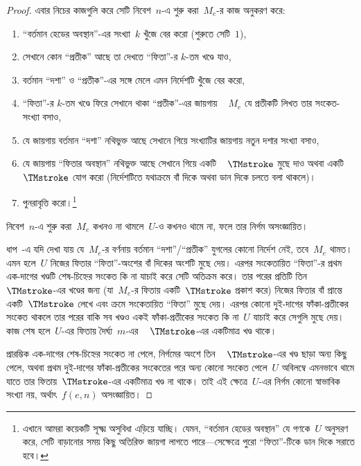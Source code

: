 \documentclass[../../../include/open-logic-section]{subfiles}
\begin{document}
\begin{proof}
  এবার নিচের কাজগুলি করে সেটি নিবেশ~$n$-এ শুরু করা~$M_e$-র কাজ অনুকরণ
  করে:
  \begin{enumerate}
    \item “বর্তমান হেডের অবস্থান”-এর সংখ্যা~$k$ খুঁজে বের করো (শুরুতে
    সেটি~$1$),
    \item সেখানে কোন “প্রতীক” আছে তা দেখতে “ফিতা”-র $k$-তম খণ্ডে যাও,
    \item{}%
    বর্তমান “দশা” ও “প্রতীক”-এর সঙ্গে মেলে এমন নির্দেশটি খুঁজে বের করো,
    \item “ফিতা”-র $k$-তম খণ্ডে ফিরে সেখানে থাকা “প্রতীক”-এর জায়গায়
    ~ $M_e$ যে প্রতীকটি লিখত তার সংকেত-সংখ্যা বসাও,
    \item যে জায়গায় বর্তমান “দশা” নথিভুক্ত আছে সেখানে গিয়ে সংখ্যাটির
    জায়গায় নতুন দশার সংখ্যা বসাও,
    \item যে জায়গায় “ফিতার অবস্থান” নথিভুক্ত আছে সেখানে গিয়ে একটি
    ~ $\TMstroke$ মুছে দাও অথবা একটি~$\TMstroke$ যোগ করো (নির্দেশটিতে
    যথাক্রমে বাঁ দিকে অথবা ডান দিকে চলতে বলা থাকলে)।
    \item পুনরাবৃত্তি করো।\footnote{এখানে আমরা কয়েকটি সূক্ষ্ম অসুবিধা
    এড়িয়ে যাচ্ছি। যেমন, “বর্তমান হেডের অবস্থান” যে গণকে~$U$ অনুসরণ করে,
    সেটি বাড়ানোর সময় কিছু অতিরিক্ত জায়গা লাগতে পারে—সেক্ষেত্রে পুরো
    “ফিতা”-টিকে ডান দিকে সরাতে হবে।}
  \end{enumerate}
  নিবেশ~$n$-এ শুরু করা~$M_e$ কখনও না থামলে~$U$-ও কখনও থামে না, ফলে তার
  নির্গম অসংজ্ঞায়িত।

  ধাপ~-এ যদি দেখা যায় যে~$M_e$-র বর্ণনায় বর্তমান
  “দশা”/“প্রতীক” যুগলের কোনো নির্দেশ নেই, তবে~$M_e$ থামত। এমন হলে~$U$
  নিজের ফিতার “ফিতা”-অংশের বাঁ দিকের অংশটি মুছে দেয়। এরপর সংকেতায়িত
  “ফিতা”-র প্রথম এক-দাগের খণ্ডটি শেষ-চিহ্নের সংকেত কি না যাচাই করে
  সেটি অতিক্রম করে। তার পরের প্রতিটি তিন~$\TMstroke$-এর খণ্ডের জন্য
  (যা~$M_e$-র ফিতায় একটি~$\TMstroke$ প্রকাশ করে) নিজের ফিতার বাঁ প্রান্তে
  একটি~$\TMstroke$ লেখে এবং ক্রমে সংকেতায়িত “ফিতা” মুছে দেয়। এরপর কোনো
  দুই-দাগের ফাঁকা-প্রতীকের সংকেত থাকলে তার পরের বাকি সব খণ্ডও একই
  ফাঁকা-প্রতীকের সংকেত কি না~$U$ যাচাই করে সেগুলি মুছে দেয়। কাজ শেষ
  হলে~$U$-এর ফিতায় দৈর্ঘ্য~$m$-এর
  ~ $\TMstroke$-এর একটিমাত্র খণ্ড থাকে।

  প্রারম্ভিক এক-দাগের শেষ-চিহ্নের সংকেত না পেলে, নির্গমের অংশে তিন
  ~ $\TMstroke$-এর খণ্ড ছাড়া অন্য কিছু পেলে, অথবা প্রথম দুই-দাগের
  ফাঁকা-প্রতীকের সংকেতের পরে অন্য কোনো সংকেত পেলে~$U$ অবিলম্বে এমনভাবে
  থামে যাতে তার ফিতায়~$\TMstroke$-এর একটিমাত্র খণ্ড না থাকে। তাই এই
  ক্ষেত্রে~$U$-এর নির্গম কোনো স্বাভাবিক সংখ্যা নয়, অর্থাৎ~$f(e,n)$
  অসংজ্ঞায়িত।

\end{proof}
\end{document}
